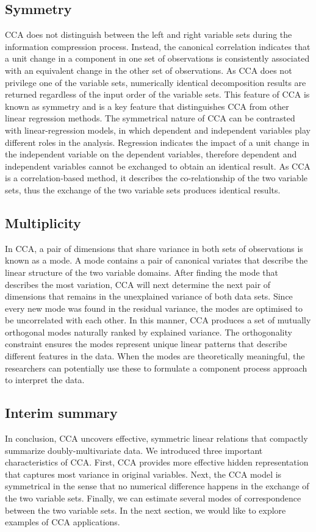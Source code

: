 \subsection{Symmetry} 
\label{ch:methods:intuitions:2}
CCA does not distinguish between the left and right variable sets during the information compression process. Instead, the canonical correlation indicates that a unit change in a component in one set of observations is consistently associated with an equivalent change in the other set of observations. As CCA does not privilege one of the variable sets, numerically identical decomposition results are returned regardless of the input order of the variable sets. This feature of CCA is known as symmetry and is a key feature that distinguishes CCA from other linear regression methods. The symmetrical nature of CCA can be contrasted with linear-regression models, in which dependent and independent variables play different roles in the analysis. Regression indicates the impact of a unit change in the independent variable on the dependent variables, therefore dependent and independent variables cannot be exchanged to obtain an identical result. As CCA is a correlation-based method, it describes the co-relationship of the two variable sets, thus the exchange of the two variable sets produces identical results.

\subsection{Multiplicity} 
\label{ch:methods:intuitions:3}
In CCA, a pair of dimensions that share variance in both sets of observations is known as a mode. A mode contains a pair of canonical variates that describe the linear structure of the two variable domains. After finding the mode that describes the most variation, CCA will next determine the next pair of dimensions that remains in the unexplained variance of both data sets. Since every new mode was found in the residual variance, the modes are optimised to be uncorrelated with each other. In this manner, CCA produces a set of mutually orthogonal modes naturally ranked by explained variance. The orthogonality constraint ensures the modes represent unique linear patterns that describe different features in the data. When the modes are theoretically meaningful, the researchers can potentially use these to formulate a component process approach to interpret the data.

\subsection{Interim summary}
In conclusion, CCA uncovers effective, symmetric linear relations that compactly summarize doubly-multivariate data. We introduced three important characteristics of CCA. First, CCA provides more effective hidden representation that captures most variance in original variables. Next, the CCA model is symmetrical in the sense that no numerical difference happens in the exchange of the two variable sets. Finally, we can estimate several modes of correspondence between the two variable sets. In the next section, we would like to explore examples of CCA applications.


